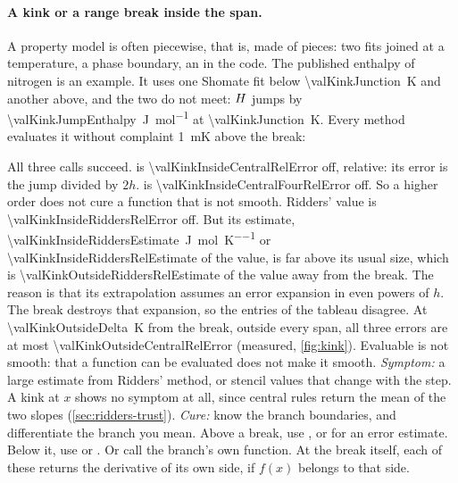 \paragraph{A kink or a range break inside the span.} A property model is often piecewise, that is, made of pieces:
two fits joined at a temperature, a phase boundary, an  in the code. The published enthalpy of nitrogen is
an example. It uses one Shomate fit below \SI{\valKinkJunction}{K} and another above, and the two do not meet:
$\enth$ jumps by \SI{\valKinkJumpEnthalpy}{\joule\per\mole} at \SI{\valKinkJunction}{K}.\cite{nist-webbook} Every
method evaluates it without complaint \SI{1}{mK} above the break:
\begin{marginfigure}
\centering

\caption{Relative error of $\cp$ against the distance $\delta$ from the range break at \SI{\valKinkJunction}{K}.
While the break lies inside a method's span, the error is a plateau. Its height is $J/h$ times the sum of the weights
on one side of the break, where $J$ is the jump in $\enth$. For  it is $J/(2h)$
(\num{\valKinkInsideCentralRelError} relative, $h = \SI{\valKinkCentralStep}{K}$). For  it is
$7J/(12h)$ while the break lies within $h$ of $x$ (\num{\valKinkInsideCentralFourRelError},
$h = \SI{\valKinkCentralFourStep}{K}$), and $-J/(12h)$ between $h$ and $2h$: the figure shows these two levels. So
the error falls as $1/h$ across the rules, whatever their order. No rule fails; only Ridders' estimate (dashed) shows
a jump.\label{fig:kink}}
\end{marginfigure}
All three calls succeed.  is \num{\valKinkInsideCentralRelError} off, relative: its error is the
jump divided by $2h$.  is \num{\valKinkInsideCentralFourRelError} off. So a higher order does not
cure a function that is not smooth. Ridders' value is \num{\valKinkInsideRiddersRelError} off. But its estimate,
\SI{\valKinkInsideRiddersEstimate}{\joule\per\mole\per\kelvin} or \num{\valKinkInsideRiddersRelEstimate} of the
value, is far above its usual size, which is \num{\valKinkOutsideRiddersRelEstimate} of the value away from the
break. The reason is that its extrapolation assumes an error expansion in even powers of $h$. The break destroys that
expansion, so the entries of the tableau disagree. At \SI{\valKinkOutsideDelta}{K} from the break, outside every
span, all three errors are at most \num{\valKinkOutsideCentralRelError} (measured, \cref{fig:kink}). Evaluable is not
smooth: that a function can be evaluated does not make it smooth. \emph{Symptom:} a large estimate from Ridders'
method, or stencil values that change with the step. A kink at $x$ shows no symptom at all, since central rules
return the mean of the two slopes (\cref{sec:ridders-trust}). \emph{Cure:} know the branch boundaries, and
differentiate the branch you mean. Above a break, use , or  for an error
estimate. Below it, use  or . Or call the branch's own function. At the break
itself, each of these returns the derivative of its own side, if $f(x)$ belongs to that side.

